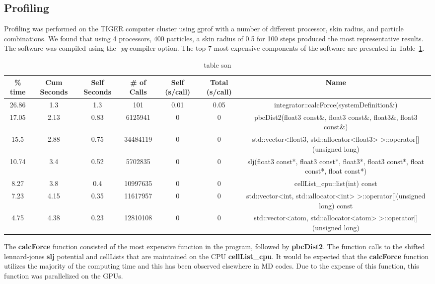 \documentclass[12pt]{article}
\begin{document}
\subsection{Profiling}

Profiling was performed on the TIGER computer cluster using gprof with a number of different processor, skin radius, and particle combinations. We found that using 4 processors, 400 particles, a skin radius of 0.5 for 100 steps produced the most representative results. The software was compiled using the \textit{-pg} compiler option. The top 7 most expensive components of the software are presented in Table~\ref{tab:profiling}.

\begin{table}[htbp]
  \centering
  \tiny
  \caption{table son}
    \begin{tabular}{ccccccc}
    \toprule
    \% time & Cum Seconds & Self Seconds & \# of Calls & Self (s/call) & Total (s/call) & Name \\
    \midrule
    26.86 & 1.3   & 1.3   & 101   & 0.01  & 0.05  & integrator::calcForce(systemDefinition\&) \\
    17.05 & 2.13  & 0.83  & 6125941 & 0     & 0     & pbcDist2(float3 const\&, float3 const\&, float3\&, float3 const\&) \\
    15.5  & 2.88  & 0.75  & 34484119 & 0     & 0     & std::vector<float3, std::allocator<float3> >::operator[](unsigned long) \\
    10.74 & 3.4   & 0.52  & 5702835 & 0     & 0     & slj(float3 const*, float3 const*, float3*, float3 const*, float const*, float const*) \\
    8.27  & 3.8   & 0.4   & 10997635 & 0     & 0     & cellList\_cpu::list(int) const \\
    7.23  & 4.15  & 0.35  & 11617957 & 0     & 0     & std::vector<int, std::allocator<int> >::operator[](unsigned long) const \\
    4.75  & 4.38  & 0.23  & 12810108 & 0     & 0     & std::vector<atom, std::allocator<atom> >::operator[](unsigned long) \\
    \bottomrule
    \end{tabular}%
  \label{tab:profiling}%
\end{table}%

The \textbf{calcForce} function consisted of the most expensive function in the program, followed by \textbf{pbcDist2}. The function calls to the shifted lennard-jones \textbf{slj} potential and cellLists that are maintained on the CPU \textbf{cellList\_cpu}. It would be expected that the \textbf{calcForce} function utilizes the majority of the computing time and this has been observed elsewhere in MD codes. Due to the expense of this function, this function was parallelized on the GPUs.
\end{document}

